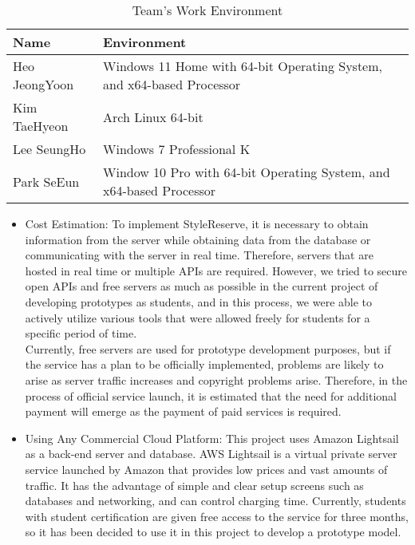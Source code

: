 \documentclass[conference]{IEEEtran}
\begin{document}
 \begin{table}[htp]
 \caption{Team's Work Environment}
 \begin{tabular}{| p{3cm}|p{5.2cm} |}
 \hline
 Name & Environment \\ 
 \hline
 Heo JeongYoon & Windows 11 Home with 64-bit Operating System, and x64-based Processor \\
 \hline
 Kim TaeHyeon & Arch Linux 64-bit \\ 
 \hline
 Lee SeungHo & Windows 7 Professional K \\ 
 \hline
 Park SeEun & Window 10 Pro with 64-bit Operating System, and x64-based Processor \\ 
 \hline
 \end{tabular}
 \end{table}

\newpage
\begin{itemize}
    \item Cost Estimation: To implement StyleReserve, it is necessary to obtain information from the server while obtaining data from the database or communicating with the server in real time. Therefore, servers that are hosted in real time or multiple APIs are required. However, we tried to secure open APIs and free servers as much as possible in the current project of developing prototypes as students, and in this process, we were able to actively utilize various tools that were allowed freely for students for a specific period of time.\\
    Currently, free servers are used for prototype development purposes, but if the service has a plan to be officially implemented, problems are likely to arise as server traffic increases and copyright problems arise. Therefore, in the process of official service launch, it is estimated that the need for additional payment will emerge as the payment of paid services is required.\\
    
    \item Using Any Commercial Cloud Platform: This project uses Amazon Lightsail as a back-end server and database. AWS Lightsail is a virtual private server service launched by Amazon that provides low prices and vast amounts of traffic. It has the advantage of simple and clear setup screens such as databases and networking, and can control charging time. Currently, students with student certification are given free access to the service for three months, so it has been decided to use it in this project to develop a prototype model.\\
    \end{itemize}
\end{document}
